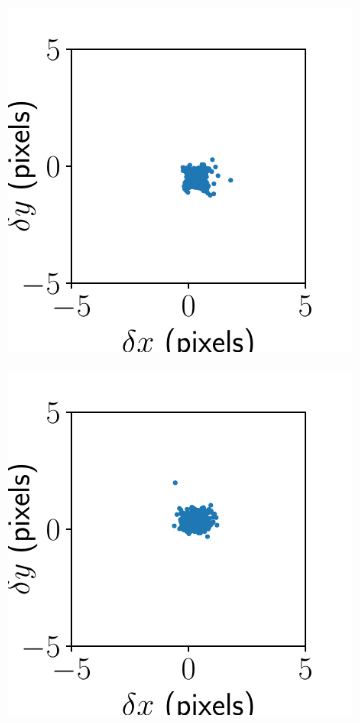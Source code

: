 \documentclass{article}
\begin{document}
\begin{figure}[ht]
	\centering
	\begin{subfigure}{0.24\linewidth}
		\includegraphics[width=\linewidth]{alignment-result-BMS-4.pdf}
		\caption{}
		\label{fig:alignmentresultBMS4}
	\end{subfigure}
	\begin{subfigure}{0.24\linewidth}
		\includegraphics[width=\linewidth]{alignment-result-BMS-3.pdf}

\end{subfigure}
\end{figure}
\end{document}
